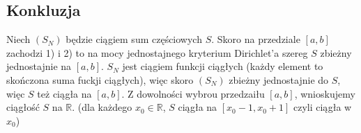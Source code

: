 \documentclass{article}
\begin{document}
\subsection*{Konkluzja}
Niech $(S_N)$ będzie ciągiem sum częściowych $S$.
Skoro na przedziale $[a, b]$ zachodzi 1) i 2) to na mocy jednostajnego kryterium Dirichlet'a szereg $S$ zbieżny jednostajnie na $[a, b]$. \newline 
$S_N$ jest ciągiem funkcji ciągłych (każdy element to skończona suma fuckji ciągłych), więc skoro 
$(S_N)$ zbieżny jednostajnie do $S$, więc $S$ też ciągła na $[a, b]$. \newline
Z dowolności wybrou przedzaiłu $[a, b]$, wnioskujemy ciągłość $S$ na $\mathbb{R}$. (dla każdego $x_0 \in \mathbb{R}$, $S$ ciągła na $[x_0-1, x_0+1]$ czyli ciągła w $x_0$)
\end{document}
